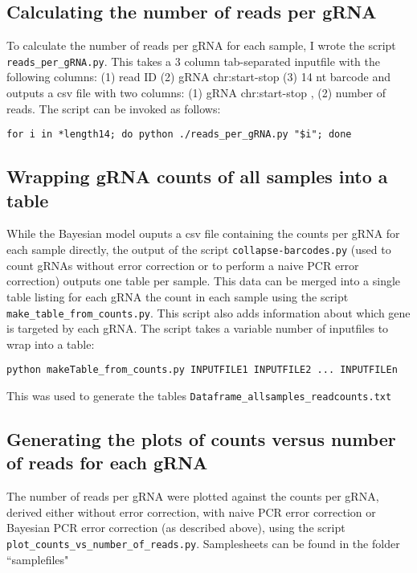 \subsection{Calculating the number of reads per gRNA}

To calculate the number of reads per gRNA for each sample, I wrote the script \verb|reads_per_gRNA.py|. This takes a 3 column tab-separated inputfile with the following columns: (1) read ID (2) gRNA chr:start-stop (3) 14 nt barcode and outputs a csv file with two columns: (1) gRNA chr:start-stop , (2) number of reads. The script can be invoked as follows:

\begin{small}\begin{lstlisting}
for i in *length14; do python ./reads_per_gRNA.py "$i"; done
\end{lstlisting}\end{small}

\subsection{Wrapping gRNA counts of all samples into a table}

While the Bayesian model ouputs a csv file containing the counts per gRNA for each sample directly, the output of the script \verb|collapse-barcodes.py| (used to count gRNAs without error correction or to perform a naive PCR error correction) outputs one table per sample. This data can be merged into a single table listing for each gRNA the count in each sample using the script \verb|make_table_from_counts.py|. This script also adds information about which gene is targeted by each gRNA. The script takes a variable number of inputfiles to wrap into a table:

\begin{small}\begin{lstlisting}
python makeTable_from_counts.py INPUTFILE1 INPUTFILE2 ... INPUTFILEn
\end{lstlisting}\end{small}

This was used to generate the tables \verb|Dataframe_allsamples_readcounts.txt|  \verb||  \verb|| 

\subsection{Generating the plots of counts versus number of reads for each gRNA}

The number of reads per gRNA were plotted against the counts per gRNA, derived either without error correction, with naive PCR error correction or Bayesian PCR error correction (as described above), using the script \verb|plot_counts_vs_number_of_reads.py|. Samplesheets can be found in the folder ``samplefiles"

